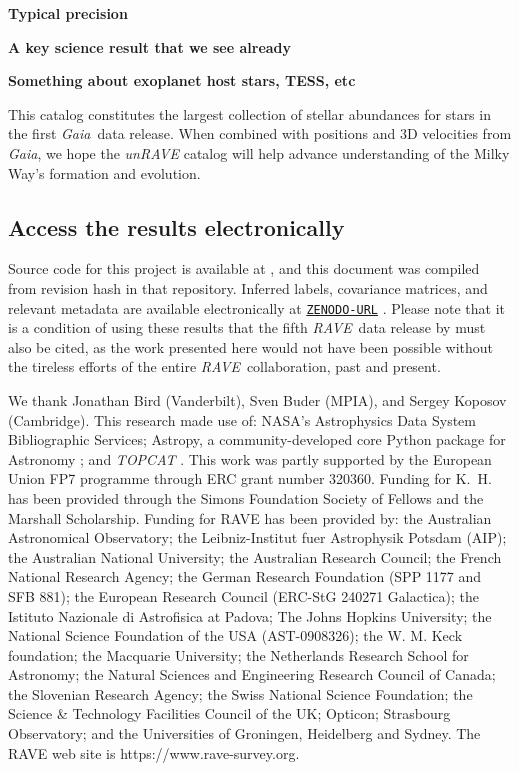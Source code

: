 \documentclass[preprint,trackchanges]{aastex}
\newcommand{\acronym}[1]{{\small{#1}}}
\newcommand{\project}[1]{\textsl{#1}}
\newcommand{\gaia}{\project{Gaia}}
\newcommand{\rave}{\project{\acronym{RAVE}}}
\newcommand{\stub}[1]{{\color{blue} \textbf{#1}}}
\begin{document}
\stub{Typical precision}

\stub{A key science result that we see already}

\stub{Something about exoplanet host stars, TESS, etc}

This catalog constitutes the largest collection of stellar abundances for stars in the
first \gaia\ data release.  When combined with positions and 3D velocities from \gaia,
we hope the \project{unRAVE} catalog will help advance understanding of the Milky Way's
formation and evolution.


\subsection*{Access the results electronically}

\noindent{}Source code for this project is available at \texttt{\giturl}\hspace{-0.5em},
and this document was compiled from revision hash \texttt{\githash} in that repository.
Inferred labels, covariance matrices, and relevant metadata are available electronically
at \texttt{\url{ZENODO-URL}} \citep{DATA_REPOSITORY}.  Please note that it is a condition
of using these results that the fifth \rave\ data release by \citet{Kunder_2016} must 
also be cited, as the work presented here would not have been possible without the 
tireless efforts of the entire \rave\ collaboration, past and present.




\acknowledgements
We thank 
	Jonathan Bird (Vanderbilt),
	Sven Buder (MPIA), 
and 
	Sergey Koposov (Cambridge).
This research made use of: 
  	NASA's Astrophysics Data System Bibliographic Services;
  	Astropy, a community-developed core Python package for Astronomy \citep{astropy};
and 
  	\project{TOPCAT} \citep{Taylor_2005}.
This work was partly supported by the European Union FP7 programme through ERC 
grant number 320360. Funding for K.~H.~ has been provided through the Simons 
Foundation Society of Fellows and the Marshall Scholarship.
Funding for RAVE has been provided by: the Australian Astronomical Observatory; 
the Leibniz-Institut fuer Astrophysik Potsdam (AIP); the Australian National 
University; the Australian Research Council; the French National Research Agency;
the German Research Foundation (SPP 1177 and SFB 881); the European Research 
Council (ERC-StG 240271 Galactica); the Istituto Nazionale di Astrofisica at 
Padova; The Johns Hopkins University; the National Science Foundation of the USA
(AST-0908326); the W. M. Keck foundation; the Macquarie University; the 
Netherlands Research School for Astronomy; the Natural Sciences and Engineering 
Research Council of Canada; the Slovenian Research Agency; the Swiss National 
Science Foundation; the Science \& Technology Facilities Council of the UK; 
Opticon; Strasbourg Observatory; and the Universities of Groningen, Heidelberg 
and Sydney. The RAVE web site is https://www.rave-survey.org.  
\end{document}
